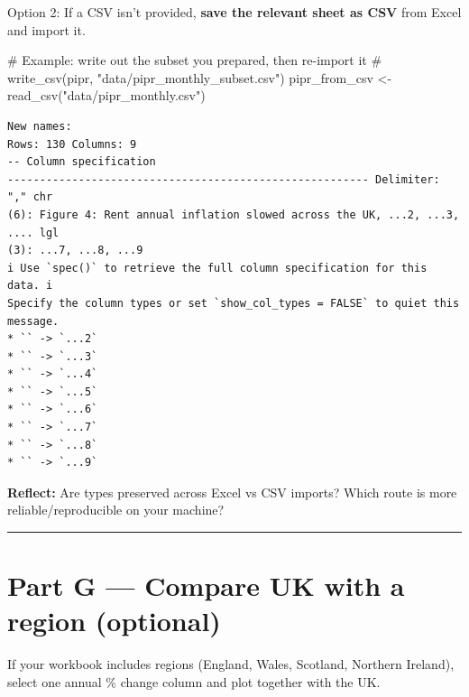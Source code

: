 \documentclass[
  letterpaper,
  DIV=11,
  numbers=noendperiod]{scrreprt}
\newenvironment{Shaded}{\begin{snugshade}}{\end{snugshade}}
\newcommand{\CommentTok}[1]{\textcolor[rgb]{0.37,0.37,0.37}{#1}}
\newcommand{\FunctionTok}[1]{\textcolor[rgb]{0.28,0.35,0.67}{#1}}
\newcommand{\NormalTok}[1]{\textcolor[rgb]{0.00,0.23,0.31}{#1}}
\newcommand{\OtherTok}[1]{\textcolor[rgb]{0.00,0.23,0.31}{#1}}
\newcommand{\StringTok}[1]{\textcolor[rgb]{0.13,0.47,0.30}{#1}}
\begin{document}
Option 2: If a CSV isn't provided, \textbf{save the relevant sheet as
CSV} from Excel and import it.

\begin{Shaded}
\begin{Highlighting}[]
\CommentTok{\# Example: write out the subset you prepared, then re{-}import it}
\CommentTok{\# write\_csv(pipr, "data/pipr\_monthly\_subset.csv")}
\NormalTok{pipr\_from\_csv }\OtherTok{\textless{}{-}} \FunctionTok{read\_csv}\NormalTok{(}\StringTok{"data/pipr\_monthly.csv"}\NormalTok{)}
\end{Highlighting}
\end{Shaded}

\begin{verbatim}
New names:
Rows: 130 Columns: 9
-- Column specification
-------------------------------------------------------- Delimiter: "," chr
(6): Figure 4: Rent annual inflation slowed across the UK, ...2, ...3, .... lgl
(3): ...7, ...8, ...9
i Use `spec()` to retrieve the full column specification for this data. i
Specify the column types or set `show_col_types = FALSE` to quiet this message.
* `` -> `...2`
* `` -> `...3`
* `` -> `...4`
* `` -> `...5`
* `` -> `...6`
* `` -> `...7`
* `` -> `...8`
* `` -> `...9`
\end{verbatim}

\textbf{Reflect:} Are types preserved across Excel vs CSV imports? Which
route is more reliable/reproducible on your machine?

\begin{center}\rule{0.5\linewidth}{0.5pt}\end{center}

\section{Part G --- Compare UK with a region
(optional)}\label{part-g-compare-uk-with-a-region-optional}

If your workbook includes regions (England, Wales, Scotland, Northern
Ireland), select one annual \% change column and plot together with the
UK.
\end{document}
